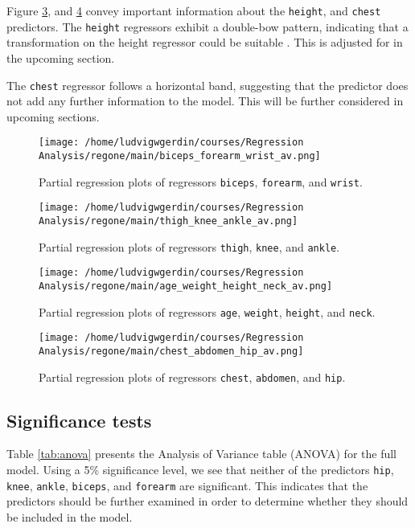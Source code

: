 \documentclass[11pt]{article}
\begin{document}
Figure \ref{fig:org32af776}, and \ref{fig:org1c12d58} 
convey important information about the \texttt{height}, and \texttt{chest} predictors.
The \texttt{height} regressors exhibit a double-bow pattern, indicating that a transformation on 
the height regressor could be suitable \cite{Montgomery2012}. This is adjusted for in the upcoming section.

The \texttt{chest} regressor follows  a horizontal band, suggesting that the predictor does not add any
further information to the model. \cite{Montgomery2012} This will be further considered in upcoming sections.

\begin{figure}[htbp]
\centering
\texttt{[image: /home/ludvigwgerdin/courses/Regression Analysis/regone/main/biceps\_forearm\_wrist\_av.png]}
\caption{\label{fig:orgf384fdf}
Partial regression plots of regressors \texttt{biceps}, \texttt{forearm}, and \texttt{wrist}.}
\end{figure}   

\begin{figure}[htbp]
\centering
\texttt{[image: /home/ludvigwgerdin/courses/Regression Analysis/regone/main/thigh\_knee\_ankle\_av.png]}
\caption{\label{fig:org70b0661}
Partial regression plots of regressors \texttt{thigh}, \texttt{knee}, and \texttt{ankle}.}
\end{figure}

\begin{figure}[htbp]
\centering
\texttt{[image: /home/ludvigwgerdin/courses/Regression Analysis/regone/main/age\_weight\_height\_neck\_av.png]}
\caption{\label{fig:org32af776}
Partial regression plots of regressors \texttt{age}, \texttt{weight}, \texttt{height}, and \texttt{neck}.}
\end{figure}

\begin{figure}[htbp]
\centering
\texttt{[image: /home/ludvigwgerdin/courses/Regression Analysis/regone/main/chest\_abdomen\_hip\_av.png]}
\caption{\label{fig:org1c12d58}
Partial regression plots of regressors \texttt{chest}, \texttt{abdomen}, and \texttt{hip}.}
\end{figure}

\subsection{Significance tests}
\label{sec:org1026325}

Table \ref{tab:anova} presents the Analysis of Variance table (ANOVA) for the full model. Using a
5\% significance level, we see that neither of the predictors \texttt{hip}, \texttt{knee}, \texttt{ankle},
\texttt{biceps}, and \texttt{forearm} are significant. This indicates that the predictors should be 
further examined in order to determine whether they should be included in the model. 
\end{document}
